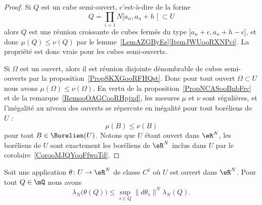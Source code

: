 \begin{proof}
	Si \( Q\) est un cube semi-ouvert, c'est-à-dire de la forme
	\begin{equation}
		Q=\prod_{i=1}N\mathopen[ a_n , a_n+h \mathclose[\subset U
	\end{equation}
	alors \( Q\) est une réunion croissante de cubes fermés du type \( \mathopen[ a_n+\epsilon , a_n+h-\epsilon \mathclose]\), et donc \( \mu(Q)\leq \nu(Q)\) par le lemme~\ref{LemAZGByEs}\ref{ItemJWUooRXNPci}. La propriété est donc vraie pour les cubes semi-ouverts.

	Si \( \Omega\) est un ouvert, alors il est réunion disjointe dénombrable de cubes semi-ouverts par la proposition~\ref{PropSKXGooRFHQst}. Donc pour tout ouvert \( \Omega\subset U\) nous avons \( \mu(\Omega)\leq\nu(\Omega)\). En vertu de la proposition~\ref{PropNCASooBnbFrc} et de la remarque~\ref{RemooOAGCooRHpjxd}, les mesures \( \mu\) et \( \nu\) sont régulières, et l'inégalité au niveau des ouverts se répercute en inégalité pour tout boréliens de \( U\) :
	\begin{equation}
		\mu(B)\leq \nu(B)
	\end{equation}
	pour tout \( B\in\Borelien(U)\). Notons que \( U\) étant ouvert dans \( \eR^N\), les boréliens de \( U\) sont exactement les boréliens de \( \eR^N\) inclus dans \( U\) par le corolaire~\ref{CorooMJQYooFfwoTd}.
\end{proof}

\begin{lemma}      \label{LemooJCEDooBRyjRg}
	Soit une application \( \theta\colon U\to \eR^N\) de classe \( C^1\) où \( U\) est ouvert dans \( \eR^N\). Pour tout \( Q\in\mQ\) nous avons
	\begin{equation}
		\lambda_N\big( \theta(Q) \big)\leq\sup_{s\in Q}\| d\theta_s \|^N\lambda_N(Q).
	\end{equation}
\end{lemma}

